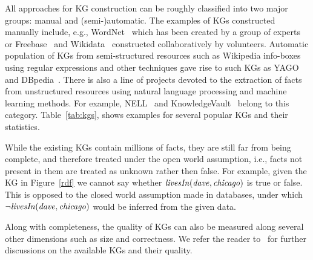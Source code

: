 
All approaches for KG construction can be roughly classified into two major groups: manual and (semi-)automatic. The examples of KGs constructed manually include, e.g., WordNet~\cite{wordnet} which has been created by a group of experts or Freebase~\cite{Freebase} and Wikidata~\cite{wikidata} constructed collaboratively by volunteers. 
Automatic population of KGs from semi-structured resources such as Wikipedia info-boxes using regular expressions and other techniques gave rise to such KGs as YAGO~\cite{yago} and DBpedia~\cite{dbpedia}. %
There is also a line of projects %
devoted to the extraction of facts from unstructured resources using natural language processing and machine learning methods. %
For example, NELL~\cite{nell} and KnowledgeVault~\cite{KnowledgeVault} belong to this category. Table~\ref{tab:kgs}, shows examples for several popular KGs and their statistics. %


While the existing KGs contain millions of facts, they are still far from being complete, and therefore treated under the open world assumption, i.e., facts not present in them are treated as unknown rather then false. For example, given the KG in Figure~\ref{rdf} we cannot say whether $\mathit{livesIn(dave,chicago)}$ is true or false. This is opposed to the closed world assumption made in databases, under which $\mathit{\neg livesIn(dave,chicago)}$ would be inferred from the given data.

Along with completeness, the quality of KGs can also be %
measured along several other dimensions such as size and correctness.  We refer the reader to~\cite{Nickel2015ARO,DBLP:journals/semweb/Paulheim17} for further discussions on the available KGs and their quality.




